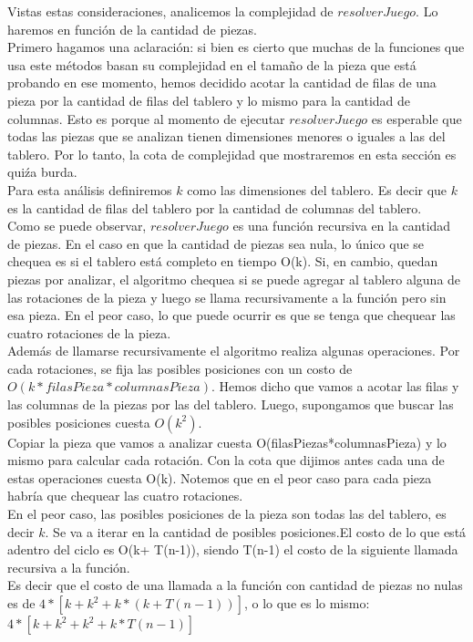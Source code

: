 \indent Vistas estas consideraciones, analicemos la complejidad de $resolverJuego$.  Lo haremos en función de la cantidad de piezas.\\
\indent Primero hagamos una aclaración: si bien es cierto que muchas de la funciones que usa este métodos basan su complejidad en el tamaño de la pieza que está probando en ese momento, hemos decidido acotar la cantidad de filas de una pieza por la cantidad de filas del tablero y lo mismo para la cantidad de columnas. Esto es porque al momento de ejecutar $resolverJuego$ es esperable que todas las piezas que se analizan tienen dimensiones menores o iguales a las del tablero. Por lo tanto, la cota de complejidad que mostraremos en esta sección es quiźa burda.\\
\indent Para esta análisis definiremos $k$ como las dimensiones del tablero. Es decir que $k$ es la cantidad de filas del tablero por la cantidad de columnas del tablero.\\

\indent Como se puede observar, $resolverJuego$ es una función recursiva en la cantidad de piezas. En el caso en que la cantidad de piezas sea nula, lo único que se chequea es si el tablero está completo en tiempo O(k).
\indent Si, en cambio, quedan piezas por analizar, el algoritmo chequea si se puede agregar al tablero alguna de las rotaciones de la pieza y luego se llama recursivamente a la función pero sin esa pieza. En el peor caso, lo que puede ocurrir es que se tenga que chequear las cuatro rotaciones de la pieza.\\
\indent Adem\'as de llamarse recursivamente el algoritmo realiza algunas operaciones. Por cada rotaciones, se fija las posibles posiciones con un costo de $O(k*filasPieza*columnasPieza)$. Hemos dicho que vamos a acotar las filas y las columnas de la piezas por las del tablero. Luego, supongamos que buscar las posibles posiciones cuesta $O(k^{2})$.\\
\indent Copiar la pieza que vamos a analizar cuesta O(filasPiezas*columnasPieza) y lo mismo para calcular cada rotación. Con la cota que dijimos antes cada una de estas operaciones cuesta O(k). Notemos que en el peor caso para cada pieza habría que chequear las cuatro rotaciones.\\
\indent En el peor caso, las posibles posiciones de la pieza son todas las del tablero, es decir $k$. Se va a iterar en la cantidad de posibles posiciones.El costo de lo que está adentro del ciclo es O(k+ T(n-1)), siendo T(n-1) el costo de la siguiente llamada recursiva a la función.\\
\indent Es decir que el costo de una llamada a la función con cantidad de piezas no nulas es de $4*[k + k^{2} + k* (k+T(n-1))]$, o lo que es lo mismo:\\
$4*[k + k^{2} + k^{2} + k* T(n-1)]$\\

